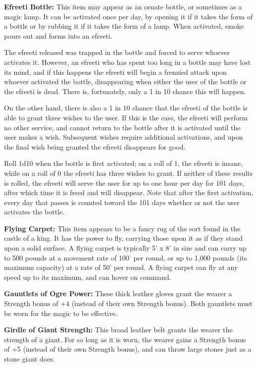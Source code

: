 \documentclass[a4paper,twoside,openany,10pt]{book}
\begin{document}
\begin{multicols}{2}
\textbf{Efreeti Bottle:} This item may appear as an ornate bottle, or sometimes as a magic lamp. It can be activated once per day, by opening it if it takes the form of a bottle or by rubbing it if it takes the form of a lamp. When activated, smoke pours out and forms into an efreeti.

The efreeti released was trapped in the bottle and forced to serve whoever activates it. However, an efreeti who has spent too long in a bottle may have lost its mind, and if this happens the efreeti will begin a frenzied attack upon whoever activated the bottle, disappearing when either the user of the bottle or the efreeti is dead. There is, fortunately, only a 1 in 10 chance this will happen.

On the other hand, there is also a 1 in 10 chance that the efreeti of the bottle is able to grant three wishes to the user. If this is the case, the efreeti will perform no other service, and cannot return to the bottle after it is activated until the user makes a wish. Subsequent wishes require additional activations, and upon the final wish being granted the efreeti disappears for good.

Roll 1d10 when the bottle is first activated; on a roll of 1, the efreeti is insane, while on a roll of 0 the efreeti has three wishes to grant. If neither of these results is rolled, the efreeti will serve the user for up to one hour per day for 101 days, after which time it is freed and will disappear. Note that after the first activation, every day that passes is counted toward the 101 days whether or not the user activates the bottle.

\textbf{Flying Carpet:} This item appears to be a fancy rug of the sort found in the castle of a king. It has the power to fly, carrying those upon it as if they stand upon a solid surface. A flying carpet is typically 5' x 8' in size and can carry up to 500 pounds at a movement rate of 100' per round, or up to 1,000 pounds (its maximum capacity) at a rate of 50' per round. A flying carpet can fly at any speed up to its maximum, and can hover on command.

\textbf{Gauntlets of Ogre Power:} These thick leather gloves grant the wearer a Strength bonus of +4 (instead of their own Strength bonus). Both gauntlets must be worn for the magic to be effective.

\textbf{Girdle of Giant Strength:} This broad leather belt grants the wearer the strength of a giant. For so long as it is worn, the wearer gains a Strength bonus of +5 (instead of their own Strength bonus), and can throw large stones just as a stone giant does.


\end{multicols}
\end{document}
